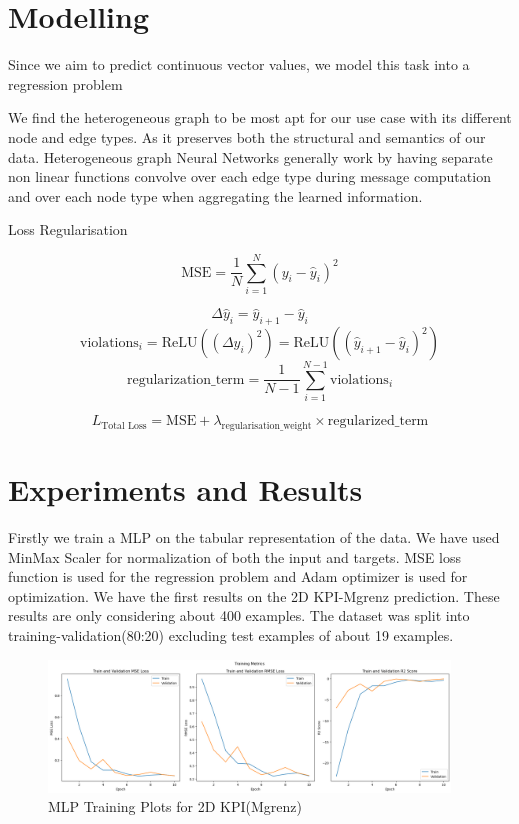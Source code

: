 \documentclass{report} %
\begin{document}
\newpage 

\chapter*{Modelling}
Since we aim to predict continuous vector values, we model this task into a regression problem

We find the heterogeneous graph to be most apt for our use case with its different node and edge types. As it preserves both the structural and semantics of our data.
Heterogeneous graph Neural Networks generally work by having separate non linear functions convolve over each edge type during message computation and over each node type when aggregating the learned information.


Loss Regularisation

\[
\text{MSE} = \frac{1}{N} \sum_{i=1}^{N} (y_i - \hat{y}_i)^2
\]

\[
\Delta \hat{y}_i = \hat{y}_{i+1} - \hat{y}_i
\]
\[
\text{violations}_i = \text{ReLU}((\Delta \hat{y}_i)^2) = \text{ReLU}((\hat{y}_{i+1} - \hat{y}_i)^2)
\]
\[
\text{regularization\_term} = \frac{1}{N-1} \sum_{i=1}^{N-1} \text{violations}_i
\]

\[
L_{\text{Total Loss}} = \text{MSE} + \lambda_{\text{regularisation\_weight}} \times \text{regularized\_term}
\]

\newpage 

\chapter*{Experiments and Results}
Firstly we train a MLP on the tabular representation of the data.
We have used MinMax Scaler for normalization of both the input and targets.
MSE loss function is used for the regression problem and Adam optimizer is used for optimization.
We have the first results on the 2D KPI-Mgrenz prediction.
These results are only considering about 400 examples. The dataset was split into training-validation(80:20) excluding test examples of about 19 examples.
\begin{figure}[h]
    \centering
    \includegraphics[width=0.95\textwidth]{./ReportImages/mlp_training_kpi2d.png} 
    \caption{MLP Training Plots for 2D KPI(Mgrenz)} 
    \label{fig:MLP Training Plots for 2D KPI(Mgrenz)}
\end{figure}
\end{document}
